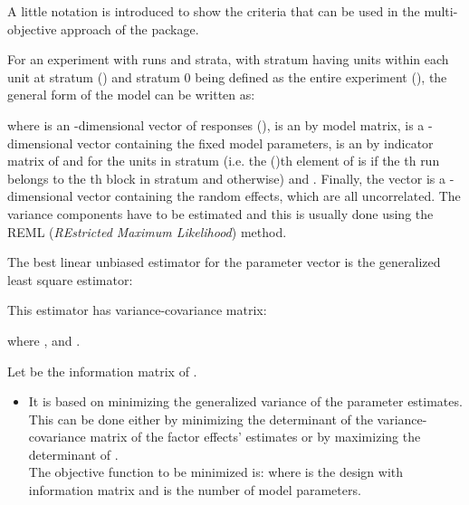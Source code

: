 \documentclass[a4paper]{book}
\begin{document}
%
\begin{Details}\relax
A little notation is introduced to show the criteria that can be
used in the multi-objective approach of the  package. \\{}

For an experiment with  runs and  strata, with stratum 
having  units within each unit at stratum () and
stratum 0 being defined as the entire experiment (), the
general form of the model can be written as:


where
 is an -dimensional vector of responses (),
 is an  by  model matrix,
\eqn{\beta}{} is a -dimensional vector containing the  fixed model parameters,
 is an  by  indicator matrix of  and
 for the units in stratum  (i.e. the ()th element
of  is  if the th run belongs to the th
block in stratum  and  otherwise) and
.
Finally, the vector  is a -dimensional vector
containing the random effects, which are all uncorrelated. The variance
components  have to be estimated and this is usually done using
the REML (\emph{REstricted Maximum Likelihood}) method.

The best linear unbiased estimator for the parameter vector \eqn{\beta}{} is
the generalized least square estimator:

This estimator has variance-covariance matrix:

where
,
 and
.

Let  be the information matrix of \eqn{\hat{\beta}}{}.

\begin{itemize}

\item{}   It is based on minimizing the generalized
variance of the parameter estimates. This can be done either by minimizing the
determinant of the variance-covariance matrix of the factor effects' estimates
or by maximizing the determinant of . \\{}
The objective function to be minimized is:
where  is the design with information matrix  and  is the
number of model parameters.


\end{itemize}
\end{Details}
\end{document}
